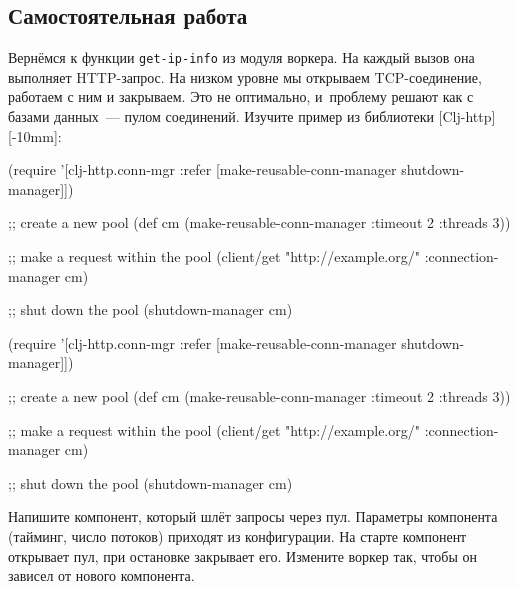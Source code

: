 \subsection{Самостоятельная работа}


Вернёмся к функции \verb|get-ip-info| из модуля воркера. На каждый вызов она
выполняет HTTP-запрос. На низком уровне мы открываем TCP-соединение, работаем с
ним и закрываем. Это не оптимально, и~проблему решают как с базами данных~---
пулом соединений. Изучите пример из библиотеки
[Clj-http][-10mm]:

\ifnarrow

\begin{english}
  \begin{clojure}
(require
 '[clj-http.conn-mgr :refer
   [make-reusable-conn-manager
    shutdown-manager]])

;; create a new pool
(def cm (make-reusable-conn-manager
         {:timeout 2 :threads 3}))

;; make a request within the pool
(client/get "http://example.org/"
            {:connection-manager cm})

;; shut down the pool
(shutdown-manager cm)
  \end{clojure}
\end{english}

\else

\begin{english}
  \begin{clojure}
(require
 '[clj-http.conn-mgr :refer
   [make-reusable-conn-manager
    shutdown-manager]])

;; create a new pool
(def cm (make-reusable-conn-manager
         {:timeout 2 :threads 3}))

;; make a request within the pool
(client/get "http://example.org/"
            {:connection-manager cm})

;; shut down the pool
(shutdown-manager cm)
  \end{clojure}
\end{english}

\fi


Напишите компонент, который шлёт запросы через пул. Параметры компонента
(тайминг, число потоков) приходят из конфигурации. На старте компонент открывает
пул, при остановке закрывает его. Измените воркер так, чтобы он зависел от
нового компонента.

